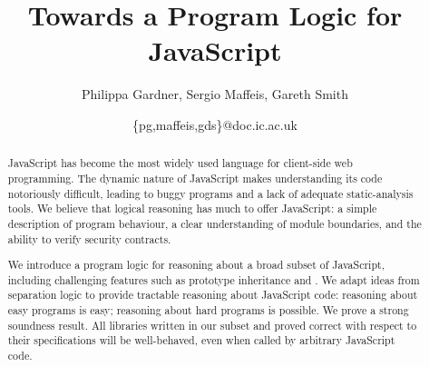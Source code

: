 \documentclass{article}
\newcommand{\iflong}[1]{#1}
\newcommand{\ifshort}[1]{}
\begin{document}
\ifshort{
\conferenceinfo{POPL'12,} {January 25--27, 2012, Philadelphia, PA, USA.}
\CopyrightYear{2012}
\copyrightdata{978-1-4503-1083-3/12/01} 
}

\newcommand{\remark}[1]{}




\title{Towards a Program Logic for JavaScript}%

\ifshort{
\authorinfo{Philippa Gardner}
           {Imperial College London}
           {pg@doc.ic.ac.uk}
\authorinfo{Sergio Maffeis}
           {Imperial College London}
           {maffeis@doc.ic.ac.uk}
\authorinfo{Gareth Smith}
           {Imperial College London}
           {gds@doc.ic.ac.uk}
}
\iflong{
\author{Philippa Gardner, Sergio Maffeis, Gareth Smith}
\date{\{pg,maffeis,gds\}@doc.ic.ac.uk}
}


\maketitle



\begin{abstract}

JavaScript has become the most widely used language for client-side web programming.  
%
The dynamic nature of JavaScript makes understanding its code notoriously difficult, leading to buggy programs and a lack of adequate static-analysis tools.  
%
We believe that logical reasoning  has much to offer JavaScript: a simple  description of program behaviour, a clear understanding of module boundaries, and the ability to verify security contracts. 

We introduce a program logic for reasoning about  a broad subset of
JavaScript, including challenging features  such as prototype inheritance and
.  We  adapt ideas  from separation logic  to provide
tractable reasoning about JavaScript code: reasoning about easy programs is
easy; reasoning about hard programs is possible. We prove a strong
soundness result. All libraries written in our subset and
proved  correct with respect to their specifications will be well-behaved,
even when called by arbitrary JavaScript code.


\end{abstract}

\ifshort{
\category{F.3.1}{Theory of Computation}{Logics and Meanings of Programs}[Specifying and Verifying and Reasoning about Programs]

\terms
Reliability, Theory, Verification

\keywords
JavaScript, Separation Logic, Web
}
\end{document}
